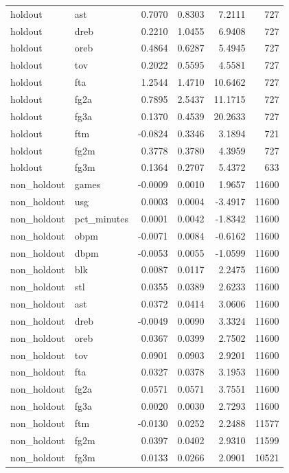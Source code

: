 \begin{table}
\begin{tabular}{llrrrr}
holdout & ast & 0.7070 & 0.8303 & 7.2111 & 727 \\
holdout & dreb & 0.2210 & 1.0455 & 6.9408 & 727 \\
holdout & oreb & 0.4864 & 0.6287 & 5.4945 & 727 \\
holdout & tov & 0.2022 & 0.5595 & 4.5581 & 727 \\
holdout & fta & 1.2544 & 1.4710 & 10.6462 & 727 \\
holdout & fg2a & 0.7895 & 2.5437 & 11.1715 & 727 \\
holdout & fg3a & 0.1370 & 0.4539 & 20.2633 & 727 \\
holdout & ftm & -0.0824 & 0.3346 & 3.1894 & 721 \\
holdout & fg2m & 0.3778 & 0.3780 & 4.3959 & 727 \\
holdout & fg3m & 0.1364 & 0.2707 & 5.4372 & 633 \\
non\_holdout & games & -0.0009 & 0.0010 & 1.9657 & 11600 \\
non\_holdout & usg & 0.0003 & 0.0004 & -3.4917 & 11600 \\
non\_holdout & pct\_minutes & 0.0001 & 0.0042 & -1.8342 & 11600 \\
non\_holdout & obpm & -0.0071 & 0.0084 & -0.6162 & 11600 \\
non\_holdout & dbpm & -0.0053 & 0.0055 & -1.0599 & 11600 \\
non\_holdout & blk & 0.0087 & 0.0117 & 2.2475 & 11600 \\
non\_holdout & stl & 0.0355 & 0.0389 & 2.6233 & 11600 \\
non\_holdout & ast & 0.0372 & 0.0414 & 3.0606 & 11600 \\
non\_holdout & dreb & -0.0049 & 0.0090 & 3.3324 & 11600 \\
non\_holdout & oreb & 0.0367 & 0.0399 & 2.7502 & 11600 \\
non\_holdout & tov & 0.0901 & 0.0903 & 2.9201 & 11600 \\
non\_holdout & fta & 0.0327 & 0.0378 & 3.1953 & 11600 \\
non\_holdout & fg2a & 0.0571 & 0.0571 & 3.7551 & 11600 \\
non\_holdout & fg3a & 0.0020 & 0.0030 & 2.7293 & 11600 \\
non\_holdout & ftm & -0.0130 & 0.0252 & 2.2488 & 11577 \\
non\_holdout & fg2m & 0.0397 & 0.0402 & 2.9310 & 11599 \\
non\_holdout & fg3m & 0.0133 & 0.0266 & 2.0901 & 10521 \\
\bottomrule
\end{tabular}
\end{table}
